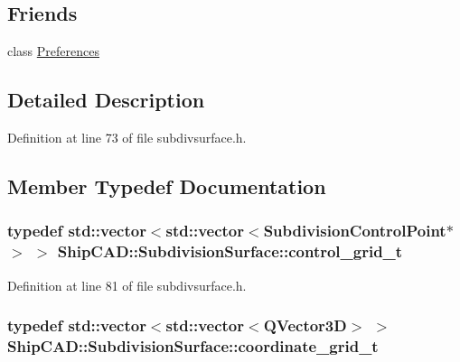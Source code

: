 \subsection*{Friends}
\begin{DoxyCompactItemize}
\item 
class \hyperlink{classShipCAD_1_1SubdivisionSurface_aac5731b90dac5ab98f6153447ce63674}{Preferences}
\end{DoxyCompactItemize}


\subsection{Detailed Description}


Definition at line 73 of file subdivsurface.\-h.



\subsection{Member Typedef Documentation}
\hypertarget{classShipCAD_1_1SubdivisionSurface_ae53cacefe98ce33992a05f941f4ff4ee}{
\subsubsection[{control\-\_\-grid\-\_\-t}]{\setlength{\rightskip}{0pt plus 5cm}typedef std\-::vector$<$std\-::vector$<${\bf Subdivision\-Control\-Point}$\ast$$>$ $>$ {\bf Ship\-C\-A\-D\-::\-Subdivision\-Surface\-::control\-\_\-grid\-\_\-t}}}\label{classShipCAD_1_1SubdivisionSurface_ae53cacefe98ce33992a05f941f4ff4ee}


Definition at line 81 of file subdivsurface.\-h.

\hypertarget{classShipCAD_1_1SubdivisionSurface_a8ed657cb7d4cd34662bd2d3e949d3e3b}{
\subsubsection[{coordinate\-\_\-grid\-\_\-t}]{\setlength{\rightskip}{0pt plus 5cm}typedef std\-::vector$<$std\-::vector$<$Q\-Vector3\-D$>$ $>$ {\bf Ship\-C\-A\-D\-::\-Subdivision\-Surface\-::coordinate\-\_\-grid\-\_\-t}}}\label{classShipCAD_1_1SubdivisionSurface_a8ed657cb7d4cd34662bd2d3e949d3e3b}


